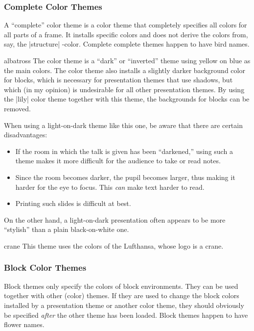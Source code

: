 \subsubsection{Complete Color Themes}

A ``complete'' color theme is a color theme that completely specifies
all colors for all parts of a frame. It installs specific colors and
does not derive the colors from, say, the |structure| \beamer-color.
Complete complete themes happen to have bird names.

\begin{colorthemeexample}{albatross}
  The color theme is a ``dark'' or ``inverted'' theme using yellow on
  blue as the main colors. The color theme also installs a slightly
  darker background color for blocks, which is necessary for
  presentation themes that use shadows, but which (in my opinion) is
  undesirable for all other presentation themes. By using the |lily|
  color theme together with this theme, the backgrounds for blocks can
  be removed.

  When using a light-on-dark theme like this one, be aware that there
  are certain disadvantages:
  \begin{itemize}
  \item
    If the room in which the talk is given has been ``darkened,''
    using such a theme makes it more difficult for the audience to
    take or read notes.
  \item
    Since the room becomes darker, the pupil becomes larger, thus
    making it harder for the eye to focus. This \emph{can} make text
    harder to  read.
  \item
    Printing such slides is difficult at best.
  \end{itemize}

  On the other hand, a light-on-dark presentation often appears to be
  more ``stylish''  than a plain black-on-white one.
\end{colorthemeexample}


\begin{colorthemeexample}{crane}
  This theme uses the colors of the Lufthansa, whose logo is a crane.
\end{colorthemeexample}


\subsubsection{Block Color Themes}

Block themes only specify the colors of block environments. They can
be used together with other (color) themes. If they are used to change the
block colors installed by a presentation theme or another color theme,
they should obviously be specified \emph{after} the other theme has
been loaded. Block themes happen to have flower names.

